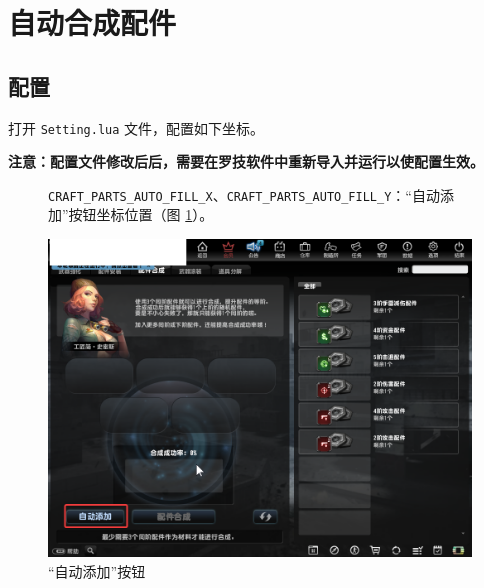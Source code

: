 \section{自动合成配件}

\subsection{配置}

打开 \lstinline{Setting.lua} 文件，配置如下坐标。

\textbf{\color{red}注意：配置文件修改后后，需要在罗技软件中重新导入并运行以使配置生效。}

\begin{figure}[H]
    \Centering
    \parbox[l]{\textwidth}{\lstinline{CRAFT_PARTS_AUTO_FILL_X}、\lstinline{CRAFT_PARTS_AUTO_FILL_Y}：“自动添加”按钮坐标位置（图 \ref{ch3fig-auto-fill}）。}
    \includegraphics[width=\textwidth]{docs/assets/auto_fill.png}
    \caption{“自动添加”按钮}
    \label{ch3fig-auto-fill}
\end{figure}
\clearpage

